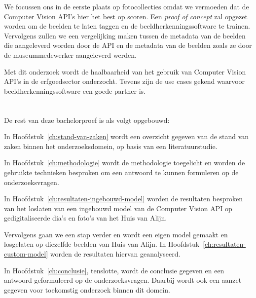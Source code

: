 We focussen ons in de eerste plaats op fotocollecties omdat we vermoeden dat de Computer Vision API’s hier het best op scoren. Een \textit{proof of concept} zal opgezet worden om de beelden te laten taggen en de beeldherkenningssoftware te trainen. Vervolgens zullen we een vergelijking maken tussen de metadata van de beelden die aangeleverd worden door de API en de metadata van de beelden zoals ze door de museummedewerker aangeleverd werden.

Met dit onderzoek wordt de haalbaarheid van het gebruik van Computer Vision API’s in de erfgoedsector onderzocht. Tevens zijn de use cases gekend waarvoor beeldherkenningssoftware een goede partner is. 

\section{}
\label{sec:opzet-bachelorproef}

De rest van deze bachelorproef is als volgt opgebouwd:

In Hoofdstuk~\ref{ch:stand-van-zaken} wordt een overzicht gegeven van de stand van zaken binnen het onderzoeksdomein, op basis van een literatuurstudie.

In Hoofdstuk~\ref{ch:methodologie} wordt de methodologie toegelicht en worden de gebruikte technieken besproken om een antwoord te kunnen formuleren op de onderzoeksvragen.

In Hoofdstuk~\ref{ch:resultaten-ingebouwd-model} worden de resultaten besproken van het loslaten van een ingebouwd model van de Computer Vision API op gedigitaliseerde dia's en foto's van het Huis van Alijn.

Vervolgens gaan we een stap verder en wordt een eigen model gemaakt en losgelaten op diezelfde beelden van Huis van Alijn. In Hoofdstuk~\ref{ch:resultaten-custom-model} worden de resultaten hiervan geanalyseerd.

In Hoofdstuk~\ref{ch:conclusie}, tenslotte, wordt de conclusie gegeven en een antwoord geformuleerd op de onderzoeksvragen. Daarbij wordt ook een aanzet gegeven voor toekomstig onderzoek binnen dit domein.